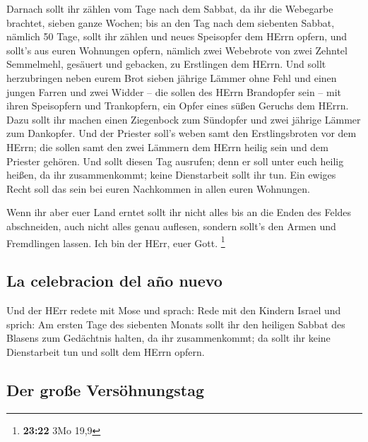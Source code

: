  Darnach sollt ihr zählen vom Tage nach dem Sabbat, da
ihr die Webegarbe brachtet, sieben ganze Wochen;  bis an
den Tag nach dem siebenten Sabbat, nämlich 50 Tage, sollt ihr zählen und
neues Speisopfer dem HErrn opfern,  und sollt's aus euren
Wohnungen opfern, nämlich zwei Webebrote von zwei Zehntel Semmelmehl,
gesäuert und gebacken, zu Erstlingen dem HErrn.  Und
sollt herzubringen neben eurem Brot sieben jährige Lämmer ohne Fehl und
einen jungen Farren und zwei Widder -- die sollen des HErrn Brandopfer
sein -- mit ihren Speisopfern und Trankopfern, ein Opfer eines süßen
Geruchs dem HErrn.  Dazu sollt ihr machen einen
Ziegenbock zum Sündopfer und zwei jährige Lämmer zum Dankopfer.
 Und der Priester soll's weben samt den Erstlingsbroten
vor dem HErrn; die sollen samt den zwei Lämmern dem HErrn heilig sein
und dem Priester gehören.  Und sollt diesen Tag ausrufen;
denn er soll unter euch heilig heißen, da ihr zusammenkommt; keine
Dienstarbeit sollt ihr tun. Ein ewiges Recht soll das sein bei euren
Nachkommen in allen euren Wohnungen.

 Wenn ihr aber euer Land erntet sollt ihr nicht alles bis
an die Enden des Feldes abschneiden, auch nicht alles genau auflesen,
sondern sollt's den Armen und Fremdlingen lassen. Ich bin der HErr, euer
Gott. \footnote{\textbf{23:22} 3Mo 19,9}

\hypertarget{la-celebracion-del-auxf1o-nuevo}{%
\subsection{La celebracion del año
nuevo}\label{la-celebracion-del-auxf1o-nuevo}}

 Und der HErr redete mit Mose und sprach: 
Rede mit den Kindern Israel und sprich: Am ersten Tage des siebenten
Monats sollt ihr den heiligen Sabbat des Blasens zum Gedächtnis halten,
da ihr zusammenkommt;  da sollt ihr keine Dienstarbeit
tun und sollt dem HErrn opfern.

\hypertarget{der-grouxdfe-versuxf6hnungstag}{%
\subsection{Der große
Versöhnungstag}\label{der-grouxdfe-versuxf6hnungstag}}


